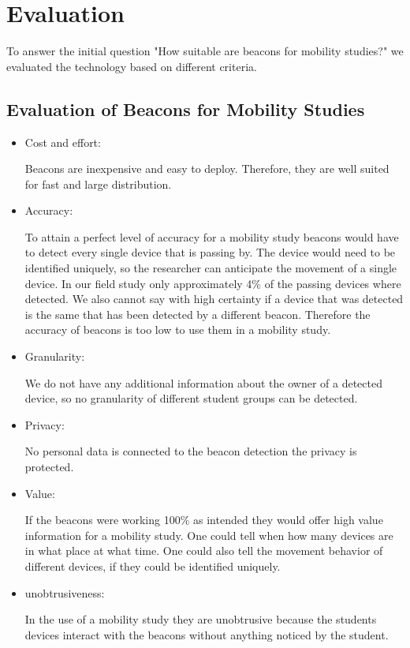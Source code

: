 \section{Evaluation}
To answer the initial question "How suitable are beacons for mobility studies?" we evaluated the technology based on different criteria.

\subsection{Evaluation of Beacons for Mobility Studies}

\begin{itemize}
\item Cost and effort: 
\par Beacons are inexpensive and easy to deploy. Therefore, they are well suited for fast and large distribution.
\item Accuracy:
\par To attain a perfect level of accuracy for a mobility study beacons would have to detect every single device that is passing by. The device would need to be identified uniquely, so the researcher can anticipate the movement of a single device. In our field study only approximately 4\% of the passing devices where detected. We also cannot say with high certainty if a device that was detected is the same that has been detected by a different beacon. Therefore the accuracy of beacons is too low to use them in a mobility study.
\item Granularity:
\par We do not have any additional information about the owner of a detected device, so no granularity of different student groups can be detected.
\item Privacy: 
\par No personal data is connected to the beacon detection the privacy is protected.
\item Value:
\par If the beacons were working 100\% as intended they would offer high value information for a mobility study. One could tell when how many devices are in what place at what time. One could also tell the movement behavior of different devices, if they could be identified uniquely. 
\item unobtrusiveness: 
\par In the use of a mobility study they are unobtrusive because the students devices interact with the beacons without anything noticed by the student. 
\end{itemize}

